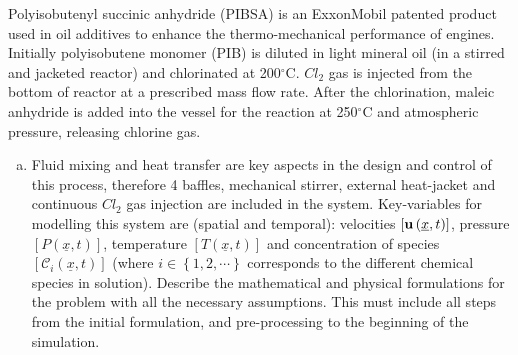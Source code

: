 \documentclass[calculator,datasheet]{exam}
\begin{document}
\clearpage

\begin{question}
Polyisobutenyl succinic anhydride (PIBSA) is an ExxonMobil patented product used in oil additives to enhance the thermo-mechanical performance of engines. Initially polyisobutene monomer (PIB) is diluted in light mineral oil (in a stirred and jacketed reactor) and chlorinated at 200$^{\circ}$C. $Cl_{2}$ gas is injected from the bottom of reactor at a prescribed mass flow rate. After the chlorination, maleic anhydride is added into the vessel for the reaction at 250$^{\circ}$C and atmospheric pressure, releasing chlorine gas.
\begin{enumerate}[(a)]
\item Fluid mixing and heat transfer are key aspects in the design and control of this process, therefore 4 baffles, mechanical stirrer, external heat-jacket and continuous $Cl_{2}$ gas injection are included in the system. Key-variables for modelling this system are (spatial and temporal): velocities $\left[{\bf u}\left(\underline{x},t\right)\right]$, pressure $\left[P\left(\underline{x},t\right)\right]$, temperature $\left[T\left(\underline{x},t\right)\right]$ and concentration of species $\left[\mathcal{C}_{i}\left(\underline{x},t\right)\right]$ (where $i\in\left\{1,2,\cdots\right\}$ corresponds to the different chemical species in solution). Describe the mathematical and physical formulations for the problem with all the necessary assumptions. This must include all steps from the initial formulation, and pre-processing to the beginning of the simulation.
\end{enumerate}

\end{question}


\vfill


\paperend
\end{document}
